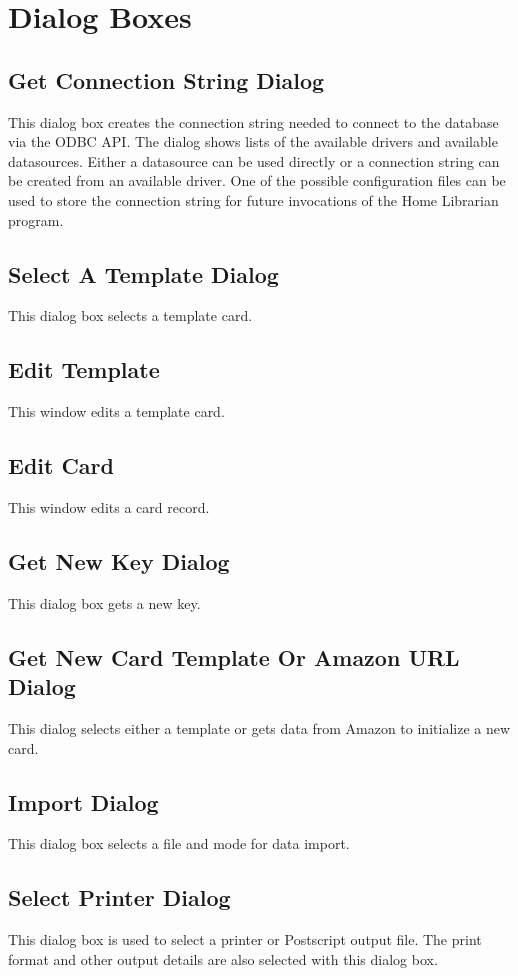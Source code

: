 \section{Dialog Boxes}
\subsection{Get Connection String Dialog}
This dialog box creates the connection string needed to connect to the
database via the ODBC API. The dialog shows lists of the available
drivers and available datasources.  Either a datasource can be used
directly or a connection string can be created from an available
driver. One of the possible configuration files can be used to store
the connection string for future invocations of the Home Librarian
program.
\subsection{Select A Template Dialog}
This dialog box selects a template card.
\subsection{Edit Template}
This window edits a template card.
\subsection{Edit Card}
This window edits a card record.
\subsection{Get New Key Dialog}
This dialog box gets a new key.
\subsection{Get New Card Template Or Amazon URL Dialog}
This dialog selects either a template or gets data from Amazon to initialize 
a new card.
\subsection{Import Dialog}
This dialog box selects a file and mode for data import.
\subsection{Select Printer Dialog}
This dialog box is used to select a printer or Postscript output file.
The print format and other output details are also selected with this
dialog box.

